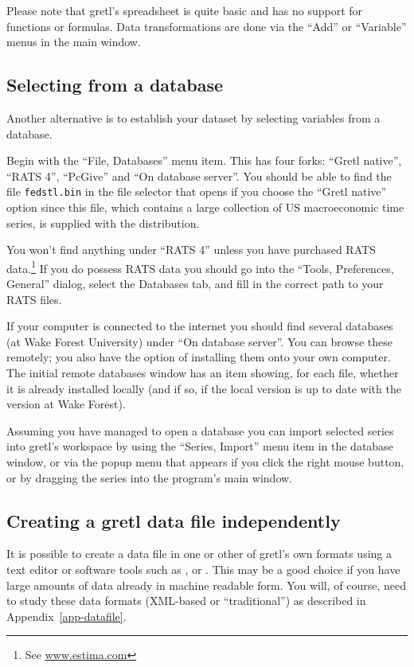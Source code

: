 Please note that gretl's spreadsheet is quite basic and has no
support for functions or formulas.  Data transformations are done via
the ``Add'' or ``Variable'' menus in the main window.

\subsection{Selecting from a database}

Another alternative is to establish your dataset by selecting
variables from a database.  

Begin with the ``File, Databases'' menu item. This has four forks:
``Gretl native'', ``RATS 4'', ``PcGive'' and ``On database server''.
You should be able to find the file \verb+fedstl.bin+ in the file
selector that opens if you choose the ``Gretl native'' option since
this file, which contains a large collection of US macroeconomic time
series, is supplied with the distribution.

You won't find anything under ``RATS 4'' unless you have purchased
RATS data.\footnote{See \href{http://www.estima.com/}{www.estima.com}}
If you do possess RATS data you should go into the ``Tools,
Preferences, General'' dialog, select the Databases tab, and fill in
the correct path to your RATS files.  

If your computer is connected to the internet you should find several
databases (at Wake Forest University) under ``On database server''.
You can browse these remotely; you also have the option of installing
them onto your own computer.  The initial remote databases window has
an item showing, for each file, whether it is already installed
locally (and if so, if the local version is up to date with the
version at Wake Forest).

Assuming you have managed to open a database you can import selected
series into gretl's workspace by using the ``Series, Import''
menu item in the database window, or via the popup menu that appears
if you click the right mouse button, or by dragging the series into
the program's main window.

\subsection{Creating a gretl data file independently}

It is possible to create a data file in one or other of gretl's own
formats using a text editor or software tools such as ,
 or .  This may be a good choice if you have large
amounts of data already in machine readable form. You will, of course,
need to study these data formats (XML-based or ``traditional'') as
described in Appendix~\ref{app-datafile}.

